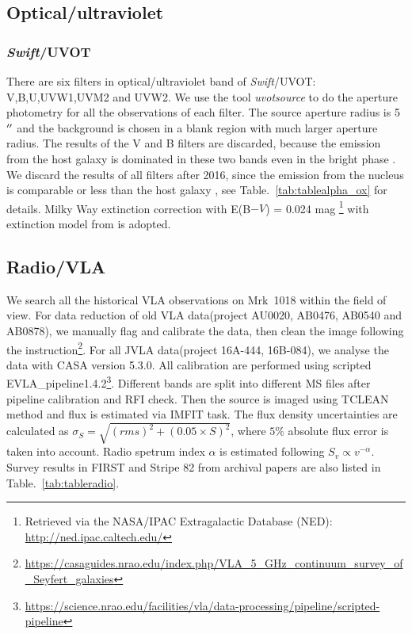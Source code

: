 \documentclass[twocolumn]{aastex63}
\newcommand{\swift}{{\em Swift}}
\begin{document}
\subsection{Optical/ultraviolet}
\subsubsection{\swift/UVOT}
There are six filters in optical/ultraviolet band of \swift/UVOT: V,B,U,UVW1,UVM2 and UVW2. We use the tool \textit{uvotsource} to do the aperture photometry for all the observations of each filter. The source aperture radius is 5$\mbox{$^{\prime\prime}$}$ and the background is chosen in a blank region with much larger aperture radius. The results of the V and B filters are discarded, because the emission from the host galaxy is dominated in these two bands even in the bright phase \citep{2018MNRAS.480.3898N}. We discard the results of all filters after 2016, since the emission from the nucleus is comparable or less than the host galaxy \citep{2018MNRAS.480.3898N}, see Table.~\ref{tab:tablealpha_ox} for details. Milky Way extinction correction with \texorpdfstring{E(B$-V$) = 0.024}. mag \footnote{Retrieved via the NASA/IPAC Extragalactic Database (NED): \url{http://ned.ipac.caltech.edu/}} with extinction model from \citet{2007ApJ...663..320F} is adopted.  


\subsection{Radio/VLA}
We search all the historical VLA observations on Mrk~1018 within the field of view. For data reduction of old VLA data(project AU0020, AB0476, AB0540 and AB0878), we manually flag and calibrate the data, then clean the image following the instruction\footnote{\url{https://casaguides.nrao.edu/index.php/VLA_5_GHz_continuum_survey_of_Seyfert_galaxies}}. For all JVLA data(project 16A-444, 16B-084),  we analyse the data with CASA version 5.3.0\citep{2007ASPC..376..127M}. All calibration are performed using scripted EVLA\_pipeline1.4.2\footnote{\url{https://science.nrao.edu/facilities/vla/data-processing/pipeline/scripted-pipeline}}. Different bands are split into different MS files after pipeline calibration and RFI check. Then the source is imaged using TCLEAN method and flux is estimated via IMFIT task. The flux density uncertainties are calculated as $\sigma_{S}=\sqrt{(rms)^2+(0.05\times S)^2}$, where $5\%$ absolute flux error is taken into account. Radio spetrum index $\alpha$ is estimated following $S_v \propto v^{-\alpha}$. Survey results in FIRST\citep{1994ASPC...61..165B,1995ApJ...450..559B} and Stripe 82\citep{2011AJ....142....3H} from archival papers are also listed in Table.~\ref{tab:tableradio}.
\end{document}
